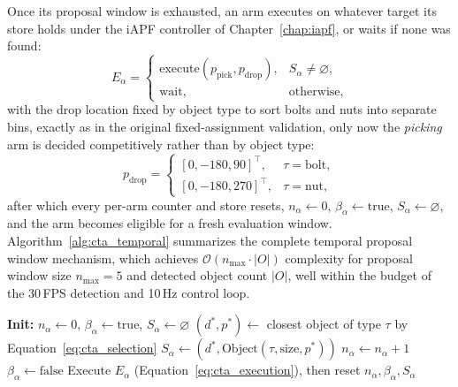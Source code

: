 Once its proposal window is exhausted, an arm executes on whatever target its store holds under the
iAPF controller of Chapter~\ref{chap:iapf}, or waits if none was found:
\begin{equation}
E_\alpha =
\begin{cases}
\text{execute}(p_{\text{pick}}, p_{\text{drop}}), & S_\alpha \neq \varnothing, \\
\text{wait}, & \text{otherwise},
\end{cases}
\label{eq:cta_execution}
\end{equation}
with the drop location fixed by object type to sort bolts and nuts into separate bins, exactly as
in the original fixed-assignment validation, only now the \emph{picking} arm is decided
competitively rather than by object type:
\begin{equation}
p_{\text{drop}} =
\begin{cases}
[0, -180, 90]^\top, & \tau = \text{bolt}, \\
[0, -180, 270]^\top, & \tau = \text{nut},
\end{cases}
\label{eq:cta_dropzone}
\end{equation}
after which every per-arm counter and store resets, $n_\alpha \leftarrow 0$,
$\beta_\alpha \leftarrow \text{true}$, $S_\alpha \leftarrow \varnothing$, and the arm becomes
eligible for a fresh evaluation window. Algorithm~\ref{alg:cta_temporal} summarizes the complete
temporal proposal window mechanism, which achieves $\mathcal{O}(n_{\max} \cdot |O|)$ complexity for
proposal window size $n_{\max} = 5$ and detected object count $|O|$, well within the budget of the
30\,FPS detection and 10\,Hz control loop.

\begin{algorithm}[htbp]
\caption{Temporal Proposal Window Mechanism}
\label{alg:cta_temporal}
\begin{algorithmic}[1]
\STATE \textbf{Init:} $n_\alpha \leftarrow 0$, $\beta_\alpha \leftarrow \text{true}$, $S_\alpha \leftarrow \varnothing$
    \STATE $(d^*, p^*) \leftarrow$ closest object of type $\tau$ by Equation~\eqref{eq:cta_selection}
                \STATE $S_\alpha \leftarrow (d^*, \text{Object}(\tau, \text{size}, p^*))$
            \ENDIF
            \STATE $n_\alpha \leftarrow n_\alpha + 1$
        \ELSE
            \STATE $\beta_\alpha \leftarrow \text{false}$
        \ENDIF
    \ENDIF
\ENDFOR
{}
    \STATE Execute $E_\alpha$ (Equation~\eqref{eq:cta_execution}), then reset $n_\alpha, \beta_\alpha, S_\alpha$
\ENDIF
\end{algorithmic}
\end{algorithm}

